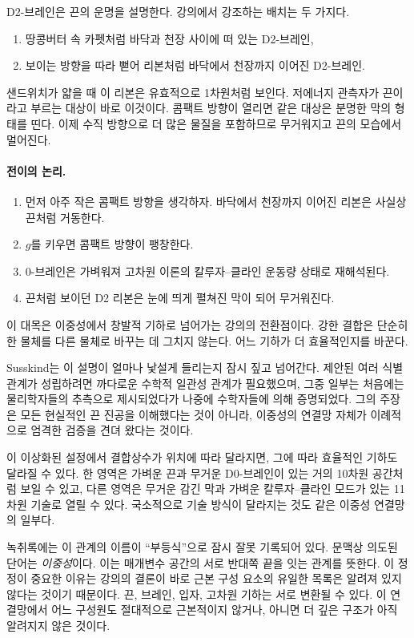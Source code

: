 D2-브레인은 끈의 운명을 설명한다. 강의에서 강조하는 배치는 두 가지다.
\begin{enumerate}
\item 땅콩버터 속 카펫처럼 바닥과 천장 사이에 떠 있는 D2-브레인,
\item 보이는 방향을 따라 뻗어 리본처럼 바닥에서 천장까지 이어진 D2-브레인.
\end{enumerate}샌드위치가 얇을 때 이 리본은 유효적으로 1차원처럼 보인다. 저에너지 관측자가 끈이라고 부르는 대상이 바로 이것이다. 콤팩트 방향이 열리면 같은 대상은 분명한 막의 형태를 띤다. 이제 수직 방향으로 더 많은 물질을 포함하므로 무거워지고 끈의 모습에서 멀어진다.

\paragraph{전이의 논리.}
\begin{enumerate}
\item 먼저 아주 작은 콤팩트 방향을 생각하자. 바닥에서 천장까지 이어진 리본은 사실상 끈처럼 거동한다.
\item \(g\)를 키우면 콤팩트 방향이 팽창한다.
\item 0-브레인은 가벼워져 고차원 이론의 칼루자--클라인 운동량 상태로 재해석된다.
\item 끈처럼 보이던 D2 리본은 눈에 띄게 펼쳐진 막이 되어 무거워진다.
\end{enumerate}
이 대목은 이중성에서 창발적 기하로 넘어가는 강의의 전환점이다. 강한 결합은 단순히 한 물체를 다른 물체로 바꾸는 데 그치지 않는다. 어느 기하가 더 효율적인지를 바꾼다.

Susskind는 이 설명이 얼마나 낯설게 들리는지 잠시 짚고 넘어간다. 제안된 여러 식별 관계가 성립하려면 까다로운 수학적 일관성 관계가 필요했으며, 그중 일부는 처음에는 물리학자들의 추측으로 제시되었다가 나중에 수학자들에 의해 증명되었다. 그의 주장은 모든 현실적인 끈 진공을 이해했다는 것이 아니라, 이중성의 연결망 자체가 이례적으로 엄격한 검증을 견뎌 왔다는 것이다.

이 이상화된 설정에서 결합상수가 위치에 따라 달라지면, 그에 따라 효율적인 기하도 달라질 수 있다. 한 영역은 가벼운 끈과 무거운 D0-브레인이 있는 거의 10차원 공간처럼 보일 수 있고, 다른 영역은 무거운 감긴 막과 가벼운 칼루자--클라인 모드가 있는 11차원 기술로 열릴 수 있다. 국소적으로 기술 방식이 달라지는 것도 같은 이중성 연결망의 일부다.

녹취록에는 이 관계의 이름이 ``부등식''으로 잠시 잘못 기록되어 있다. 문맥상 의도된 단어는 \emph{이중성}이다. 이는 매개변수 공간의 서로 반대쪽 끝을 잇는 관계를 뜻한다. 이 정정이 중요한 이유는 강의의 결론이 바로 근본 구성 요소의 유일한 목록은 알려져 있지 않다는 것이기 때문이다. 끈, 브레인, 입자, 고차원 기하는 서로 변환될 수 있다. 이 연결망에서 어느 구성원도 절대적으로 근본적이지 않거나, 아니면 더 깊은 구조가 아직 알려지지 않은 것이다.

